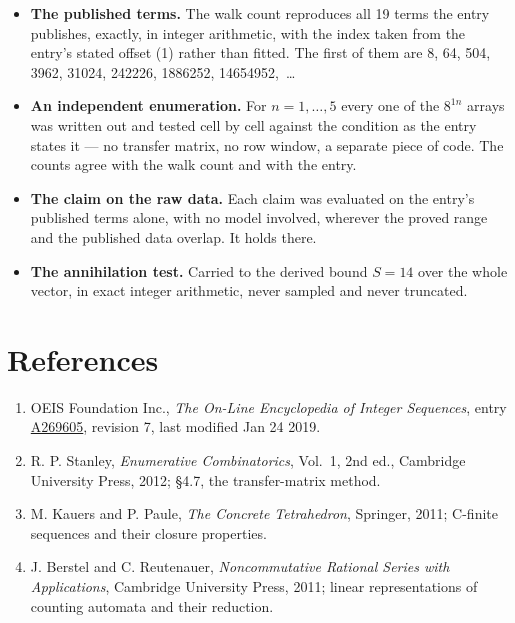 \documentclass[11pt]{article}
\theoremstyle{definition}
\begin{document}
\begin{itemize}

\item {\bfseries The published terms.} The walk count reproduces all 19 terms the entry publishes, exactly, in integer arithmetic, with the index taken from the entry's stated offset (1) rather than fitted. The first of them are 8, 64, 504, 3962, 31024, 242226, 1886252, 14654952,~\dots

\item {\bfseries An independent enumeration.} For $n = 1,\dots,5$ every one of the $8^{1n}$ arrays was written out and tested cell by cell against the condition as the entry states it --- no transfer matrix, no row window, a separate piece of code. The counts agree with the walk count and with the entry.

\item {\bfseries The claim on the raw data.} Each claim was evaluated on the entry's published terms alone, with no model involved, wherever the proved range and the published data overlap. It holds there.

\item {\bfseries The annihilation test.} Carried to the derived bound $S = 14$ over the whole vector, in exact integer arithmetic, never sampled and never truncated.

\end{itemize}

\section{References}

\begin{enumerate}

\item OEIS Foundation Inc., \emph{The On-Line Encyclopedia of Integer Sequences}, entry \href{https://oeis.org/A269605}{A269605}, revision 7, last modified Jan 24 2019.

\item R. P. Stanley, \emph{Enumerative Combinatorics}, Vol.~1, 2nd ed., Cambridge University Press, 2012; \S4.7, the transfer-matrix method.

\item M. Kauers and P. Paule, \emph{The Concrete Tetrahedron}, Springer, 2011; C-finite sequences and their closure properties.

\item J. Berstel and C. Reutenauer, \emph{Noncommutative Rational Series with Applications}, Cambridge University Press, 2011; linear representations of counting automata and their reduction.

\end{enumerate}
\end{document}
